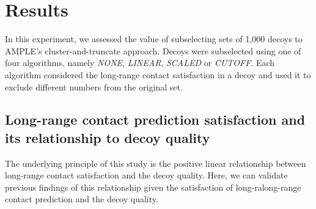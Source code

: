 %
%

\section{Results}

In this experiment, we assessed the value of subselecting sets of 1,000 decoys to AMPLE's cluster-and-truncate approach. Decoys were subselected using one of four algorithms, namely \textit{NONE}, \textit{LINEAR}, \textit{SCALED} or \textit{CUTOFF}. Each algorithm considered the long-range contact satisfaction in a decoy and used it to exclude different numbers from the original set.

\subsection{Long-range contact prediction satisfaction and its relationship to decoy quality}

The underlying principle of this study is the positive linear relationship between long-range contact satisfaction and the decoy quality. Here, we can validate previous findings of this relationship \cite{} given the satisfaction of long-ralong-range contact prediction and the decoy quality.

